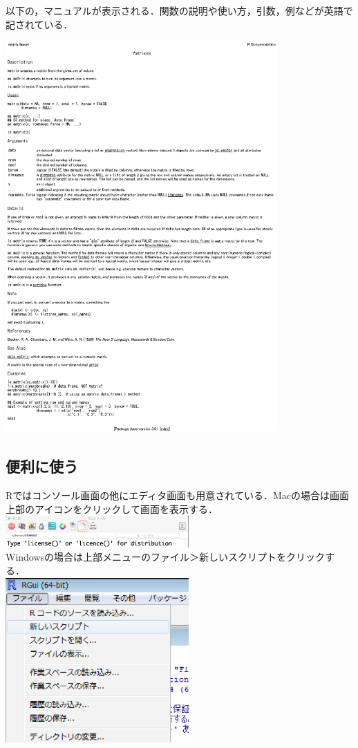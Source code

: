 以下の，マニュアルが表示される．関数の説明や使い方，引数，例などが英語で記されている．
\begin{center}
\includegraphics[height=15cm]{img/matrices.eps}
\end{center}

\subsection{便利に使う}
Rではコンソール画面の他にエディタ画面も用意されている．Macの場合は画面上部のアイコンをクリックして画面を表示する．\\
\includegraphics[width=7cm]{img/maceditor.eps}\\
Windowsの場合は上部メニューのファイル＞新しいスクリプトをクリックする．\\
\includegraphics[width=7cm]{img/wineditor.eps}

